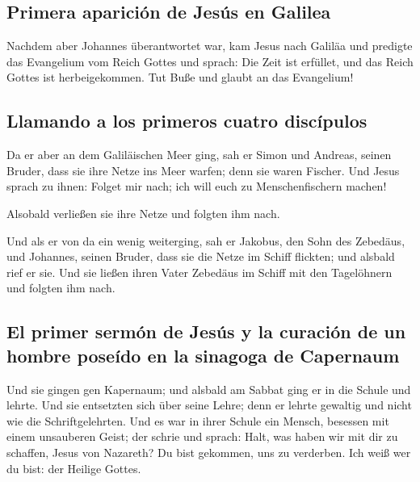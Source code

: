 \hypertarget{primera-apariciuxf3n-de-jesuxfas-en-galilea}{%
\subsection{Primera aparición de Jesús en
Galilea}\label{primera-apariciuxf3n-de-jesuxfas-en-galilea}}

 Nachdem aber Johannes überantwortet war, kam Jesus nach
Galiläa und predigte das Evangelium vom Reich Gottes  und
sprach: Die Zeit ist erfüllet, und das Reich Gottes ist herbeigekommen.
Tut Buße und glaubt an das Evangelium!

\hypertarget{llamando-a-los-primeros-cuatro-discuxedpulos}{%
\subsection{Llamando a los primeros cuatro
discípulos}\label{llamando-a-los-primeros-cuatro-discuxedpulos}}

 Da er aber an dem Galiläischen Meer ging, sah er Simon
und Andreas, seinen Bruder, dass sie ihre Netze ins Meer warfen; denn
sie waren Fischer.  Und Jesus sprach zu ihnen: Folget mir
nach; ich will euch zu Menschenfischern machen!

 Alsobald verließen sie ihre Netze und folgten ihm nach.

 Und als er von da ein wenig weiterging, sah er Jakobus,
den Sohn des Zebedäus, und Johannes, seinen Bruder, dass sie die Netze
im Schiff flickten; und alsbald rief er sie.  Und sie
ließen ihren Vater Zebedäus im Schiff mit den Tagelöhnern und folgten
ihm nach.

\hypertarget{el-primer-sermuxf3n-de-jesuxfas-y-la-curaciuxf3n-de-un-hombre-poseuxeddo-en-la-sinagoga-de-capernaum}{%
\subsection{El primer sermón de Jesús y la curación de un hombre poseído
en la sinagoga de
Capernaum}\label{el-primer-sermuxf3n-de-jesuxfas-y-la-curaciuxf3n-de-un-hombre-poseuxeddo-en-la-sinagoga-de-capernaum}}

 Und sie gingen gen Kapernaum; und alsbald am Sabbat ging
er in die Schule und lehrte.  Und sie entsetzten sich
über seine Lehre; denn er lehrte gewaltig und nicht wie die
Schriftgelehrten.  Und es war in ihrer Schule ein Mensch,
besessen mit einem unsauberen Geist; der schrie  und
sprach: Halt, was haben wir mit dir zu schaffen, Jesus von Nazareth? Du
bist gekommen, uns zu verderben. Ich weiß wer du bist: der Heilige
Gottes.

